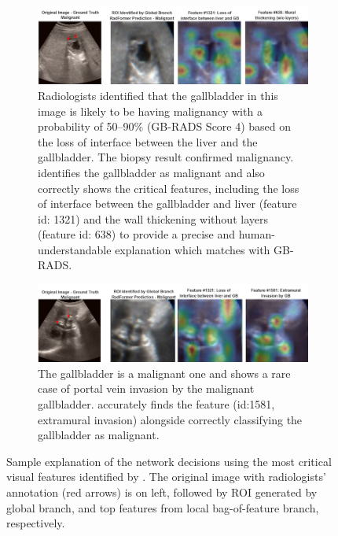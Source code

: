 %
\begin{figure}[h]
    \centering
    \begin{subfigure}[b]{0.6\linewidth}
		\centering
		\includegraphics[width=\linewidth]{figs/radformer/demo_1.png}
		\caption{Radiologists identified that the gallbladder in this image is likely to be having malignancy with a probability of 50--90\% (GB-RADS Score 4) based on the loss of interface between the liver and the gallbladder. The biopsy result confirmed malignancy. \radformer identifies the gallbladder as malignant and also correctly shows the critical features, including the loss of interface between the gallbladder and liver (feature id: 1321) and the wall thickening without layers (feature id: 638) to provide a precise and human-understandable explanation which matches with GB-RADS. }
	\end{subfigure}
    \begin{subfigure}[b]{0.6\linewidth}
		\centering
		\includegraphics[width=\linewidth]{figs/radformer/demo_2.png}
		\caption{The gallbladder is a malignant one and shows a rare case of portal vein invasion by the malignant gallbladder.  \radformer accurately finds the feature (id:1581, extramural invasion) alongside correctly classifying the gallbladder as malignant.}
	\end{subfigure}
    \caption[Sample explanation of the network decisions]{Sample explanation of the network decisions using the most critical visual features identified by \radformer. The original image with radiologists' annotation (red arrows) is on left, followed by ROI generated by \radformer global branch, and top features from local bag-of-feature branch, respectively.}
    \label{fig:radform_expl}
\end{figure}
 
